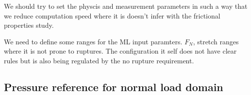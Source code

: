 We should try to set the physcis and measurement parameters in such a way that we reduce computation speed where it is doesn't infer with the frictional properties study.

We need to define some ranges for the ML input paramters. $F_N$, stretch ranges where it is not prone to ruptures. The configuration it self does not have clear rules but is also being regulated by the no rupture requirement. 









\subsection{Pressure reference for normal load domain}


